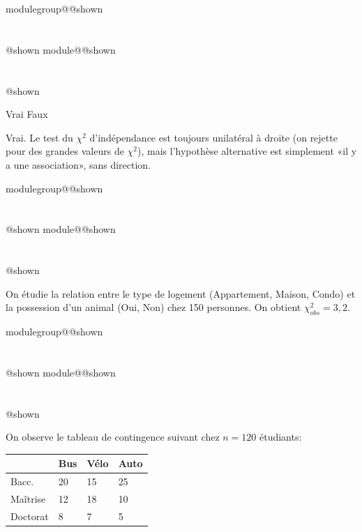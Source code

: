 \documentclass{Evaluation}
\makeatletter
\newcommand{\currentmodulekey}{}
\newcommand{\currentmoduletitle}{}
\newcommand{\currentgroupkey}{}
\newcommand{\currentgrouptitle}{}
\newcommand{\showmoduleifneeded}{%
  \ifx\currentgroupkey\empty\else
    \expandafter\ifx\csname modulegroup@\currentgroupkey @shown\endcsname\relax
      \section*{\currentgrouptitle}%
      \expandafter\gdef\csname modulegroup@\currentgroupkey @shown\endcsname{1}%
    \fi
  \fi
  \expandafter\ifx\csname module@\currentmodulekey @shown\endcsname\relax
    \section*{\currentmoduletitle}%
    \expandafter\gdef\csname module@\currentmodulekey @shown\endcsname{1}%
  \fi
}
\newenvironment{A25}{\showmoduleifneeded}{}
\makeatother
\begin{document}
\begin{questions}
\begin{A25}
\begin{parts}
    \begin{oneparcheckboxes}
        \correctchoice Vrai
        \choice Faux
    \end{oneparcheckboxes}

    \begin{solution}
        Vrai. Le test du $\chi^2$ d'indépendance est toujours unilatéral à droite (on rejette pour des grandes valeurs de $\chi^2$), mais l'hypothèse alternative est simplement «il y a une association», sans direction.
    \end{solution}
\end{parts}
\end{A25}

\begin{A25}
\question On étudie la relation entre le type de logement (Appartement, Maison, Condo) et la possession d'un animal (Oui, Non) chez 150 personnes. On obtient $\chi^2_{obs} = 3{,}2$.

\end{A25}

\begin{A25}
\question On observe le tableau de contingence suivant chez $n=120$ étudiants:

\renewcommand{\arraystretch}{2}

\begin{table}[h]
    \centering
    \begin{tabular}{|P{2.5cm}|P{2cm}|P{2cm}|P{2cm}|}
    \hline
         & Bus & Vélo & Auto \\
        \hline
        Bacc. & 20 & 15 & 25 \\
        \hline
        Maîtrise & 12 & 18 & 10 \\
        \hline
        Doctorat & 8 & 7 & 5 \\
        \hline
    \end{tabular}
\end{table}


\end{A25}
\end{questions}
\end{document}
